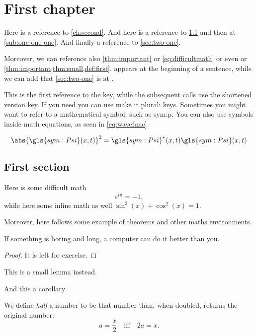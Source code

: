 \chapter{First chapter}
Here is a reference to \cref{ch:second}. And here is a reference to \cref{sec:one-one} and then at \cref{sub:one-one-one}. And finally a reference to \cref{sec:two-one}.

Moreover, we can reference also \cref{thm:important} or \cref{eq:difficultmath} or even  or \cref{thm:important,thm:small,def:first}.  appears at the beginning of a sentence, while we can add that \cref{sec:two-one} is at .

This is the first reference to the \gls{key}, while the subsequent calls use the shortened version \gls{key}. If you need you can use make it plural: \glspl{key}. Sometimes you might want to refer to a mathematical symbol, such as \gls{sym:p}. You can also use symbols inside math equations, as seen in \eqref{eq:wavefunc}.

\begin{equation}
	\abs{\gls{sym:Psi}(x,t)}^2 = \gls{sym:Psi}^\ast(x,t) \gls{sym:Psi}(x,t) \label{eq:wavefunc}
\end{equation}

\lipsum[1-3]

\section{First section}\label{sec:one-one}
Here is some difficult math
\begin{equation}\label{eq:difficultmath}
    e^{i\pi} = - 1,
\end{equation}
while here some inline math as well $\sin^2(x) + \cos^2(x) = 1$.

Moreover, here follows some example of theorems and other maths environments.
\begin{theorem}\label{thm:important}
    If something is boring and long, a computer can do it better than you.
\end{theorem}
\begin{proof}
    It is left for exercise.
\end{proof}

\begin{lemma}\label{thm:small}
    This is a small lemma instead.
\end{lemma}
\begin{corollary}\label{thm:corollary}
    And this a corollary
\end{corollary}
\begin{definition}\label{def:first}
    We define \emph{half} a number to be that number than, when doubled, returns the original number:
    \begin{equation}\label{eq:onehalf}
        a = \frac{x}{2} \quad \text{iff} \quad 2a = x.
    \end{equation}
\end{definition}

